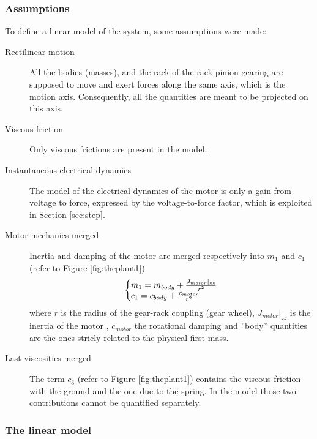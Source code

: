 \documentclass[twosided,a4paper]{article}           %
\makeatletter
\newenvironment{sistema}%
{\left\lbrace\begin{array}{@{}l@{}}}%
	{\end{array}\right.}
\makeatother
\begin{document}
\subsubsection{Assumptions}
\label{sec:ass}
To define a linear model of the system, some assumptions were made:
\begin{description}
	\item[Rectilinear motion] All the bodies (masses), and the rack of the rack-pinion gearing are supposed to move and exert forces along the same axis, which is the motion axis. Consequently, all the quantities are meant to be projected on this axis.
	\item[Viscous friction] Only viscous frictions are present in the model.
	\item[Instantaneous electrical dynamics] The model of the electrical dynamics of the motor is only a gain from voltage to force, expressed by the voltage-to-force factor, which is exploited in Section \ref{sec:step}.
	\item [Motor mechanics merged] Inertia and damping of the motor are merged respectively into $m_1$ and $c_1$ (refer to Figure \ref{fig:theplant1})
	\begin{equation}
	\begin{sistema}
	m_1 = m_{body} + \frac{J_{motor}\vert_{zz}}{r^2}\\
	c_1 = c_{body} + \frac{c_{motor}}{r^2}
	\end{sistema}
	\end{equation}
	where $r$ is the radius of the gear-rack coupling (gear wheel), $J_{motor}\vert_{zz}$ is the inertia of the motor , $c_{motor}$ the rotational damping and ''body'' quantities are the ones stricly related to the physical first mass.
	\item [Last viscosities merged] The term $c_3$ (refer to Figure \ref{fig:theplant1}) contains the viscous friction with the ground and the one due to the spring. In the model those two contributions cannot be quantified separately.
\end{description}
\subsubsection{The linear model}
\label{sec:linear_sys}
\end{document}
